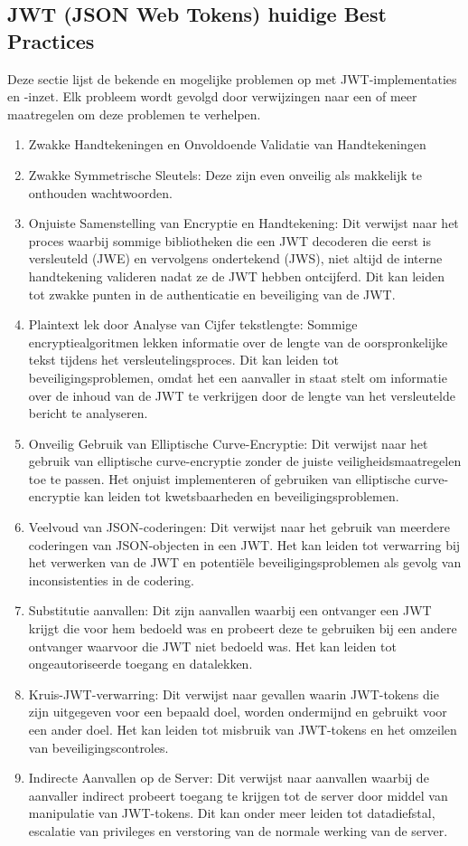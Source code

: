   \subsection{JWT (JSON Web Tokens) huidige Best Practices}%
  \label{subsec:jwt-huidige-best-practices}
  Deze sectie lijst de bekende en mogelijke problemen op met JWT-implementaties en -inzet. Elk probleem wordt gevolgd door verwijzingen naar een of meer maatregelen om deze problemen te verhelpen.
  \begin{enumerate}[label=\textbf{-}]
      \item Zwakke Handtekeningen en Onvoldoende Validatie van Handtekeningen
      \item Zwakke Symmetrische Sleutels: Deze zijn even onveilig als makkelijk te onthouden wachtwoorden.
      \item Onjuiste Samenstelling van Encryptie en Handtekening: Dit verwijst naar het proces waarbij sommige bibliotheken die een JWT decoderen die eerst is versleuteld (JWE) en vervolgens ondertekend (JWS), niet altijd de interne handtekening valideren nadat ze de JWT hebben ontcijferd. Dit kan leiden tot zwakke punten in de authenticatie en beveiliging van de JWT.
      \item Plaintext lek door Analyse van Cijfer tekstlengte: Sommige encryptiealgoritmen lekken informatie over de lengte van de oorspronkelijke tekst tijdens het versleutelingsproces. Dit kan leiden tot beveiligingsproblemen, omdat het een aanvaller in staat stelt om informatie over de inhoud van de JWT te verkrijgen door de lengte van het versleutelde bericht te analyseren.
      \item Onveilig Gebruik van Elliptische Curve-Encryptie: Dit verwijst naar het gebruik van elliptische curve-encryptie zonder de juiste veiligheidsmaatregelen toe te passen. Het onjuist implementeren of gebruiken van elliptische curve-encryptie kan leiden tot kwetsbaarheden en beveiligingsproblemen.
      \item Veelvoud van JSON-coderingen: Dit verwijst naar het gebruik van meerdere coderingen van JSON-objecten in een JWT. Het kan leiden tot verwarring bij het verwerken van de JWT en potentiële beveiligingsproblemen als gevolg van inconsistenties in de codering.
      \item Substitutie aanvallen: Dit zijn aanvallen waarbij een ontvanger een JWT krijgt die voor hem bedoeld was en probeert deze te gebruiken bij een andere ontvanger waarvoor die JWT niet bedoeld was. Het kan leiden tot ongeautoriseerde toegang en datalekken.
      \item Kruis-JWT-verwarring: Dit verwijst naar gevallen waarin JWT-tokens die zijn uitgegeven voor een bepaald doel, worden ondermijnd en gebruikt voor een ander doel. Het kan leiden tot misbruik van JWT-tokens en het omzeilen van beveiligingscontroles.
      \item Indirecte Aanvallen op de Server: Dit verwijst naar aanvallen waarbij de aanvaller indirect probeert toegang te krijgen tot de server door middel van manipulatie van JWT-tokens. Dit kan onder meer leiden tot datadiefstal, escalatie van privileges en verstoring van de normale werking van de server.
  \end{enumerate}
